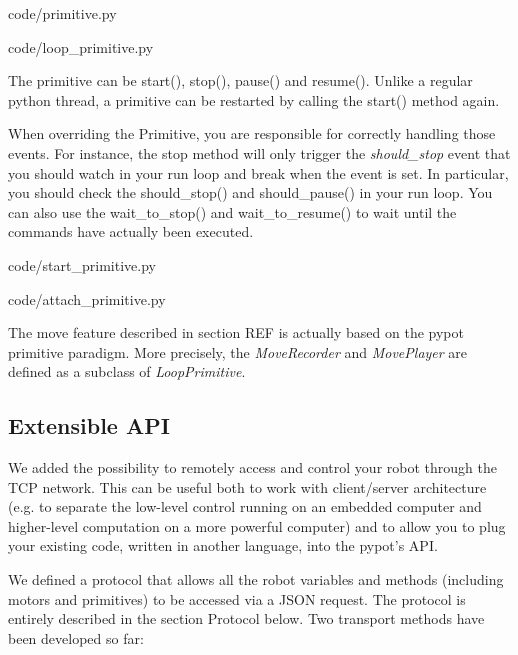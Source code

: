 
    {code/primitive.py}


    {code/loop_primitive.py}

The primitive can be start(), stop(), pause() and resume(). Unlike a regular python thread, a primitive can be restarted by calling the start() method again.

When overriding the Primitive, you are responsible for correctly handling those events. For instance, the stop method will only trigger the \emph{should\_stop} event that you should watch in your run loop and break when the event is set. In particular, you should check the should\_stop() and should\_pause() in your run loop. You can also use the wait\_to\_stop() and wait\_to\_resume() to wait until the commands have actually been executed.



    {code/start_primitive.py}


    {code/attach_primitive.py}

The move feature described in section REF is actually based on the pypot primitive paradigm. More precisely, the \emph{MoveRecorder} and \emph{MovePlayer} are defined as a subclass of \emph{LoopPrimitive}.

\subsection{Extensible API} %

We added the possibility to remotely access and control your robot through the TCP network. This can be useful both to work with client/server architecture (e.g. to separate the low-level control running on an embedded computer and higher-level computation on a more powerful computer) and to allow you to plug your existing code, written in another language, into the pypot’s API.

We defined a protocol that allows all the robot variables and methods (including motors and primitives) to be accessed via a JSON request. The protocol is entirely described in the section Protocol below. Two transport methods have been developed so far:

